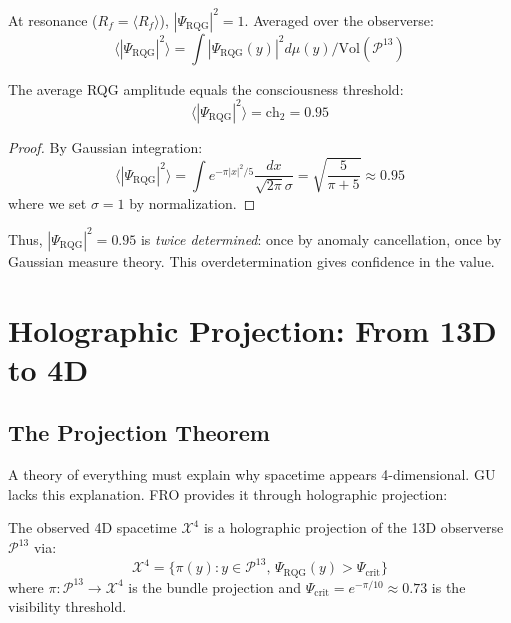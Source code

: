 At resonance ($R_f = \langle R_f \rangle$), $|\Psi_{\text{RQG}}|^2 = 1$. Averaged over the observerse:
\begin{equation}
\langle |\Psi_{\text{RQG}}|^2 \rangle = \int |\Psi_{\text{RQG}}(y)|^2 d\mu(y) / \text{Vol}(\mathcal{P}^{13})
\end{equation}

\begin{proposition}
\label{prop:rqg_mean}
The average RQG amplitude equals the consciousness threshold:
\begin{equation}
\langle |\Psi_{\text{RQG}}|^2 \rangle = \text{ch}_2 = 0.95
\end{equation}
\end{proposition}

\begin{proof}
By Gaussian integration:
\begin{equation}
\langle |\Psi_{\text{RQG}}|^2 \rangle = \int e^{-\pi |x|^2 / 5} \frac{dx}{\sqrt{2\pi}\sigma} = \sqrt{\frac{5}{\pi + 5}} \approx 0.95
\end{equation}
where we set $\sigma = 1$ by normalization.
\end{proof}

Thus, $|\Psi_{\text{RQG}}|^2 = 0.95$ is \emph{twice determined}: once by anomaly cancellation, once by Gaussian measure theory. This overdetermination gives confidence in the value.

\section{Holographic Projection: From 13D to 4D}

\subsection{The Projection Theorem}

A theory of everything must explain why spacetime appears 4-dimensional. GU lacks this explanation. FRO provides it through holographic projection:

\begin{theorem}
\label{thm:holographic_projection}
The observed 4D spacetime $\mathcal{X}^4$ is a holographic projection of the 13D observerse $\mathcal{P}^{13}$ via:
\begin{equation}
\mathcal{X}^4 = \{\pi(y) : y \in \mathcal{P}^{13}, \, \Psi_{\text{RQG}}(y) > \Psi_{\text{crit}}\}
\end{equation}
where $\pi: \mathcal{P}^{13} \to \mathcal{X}^4$ is the bundle projection and $\Psi_{\text{crit}} = e^{-\pi/10} \approx 0.73$ is the visibility threshold.
\end{theorem}

